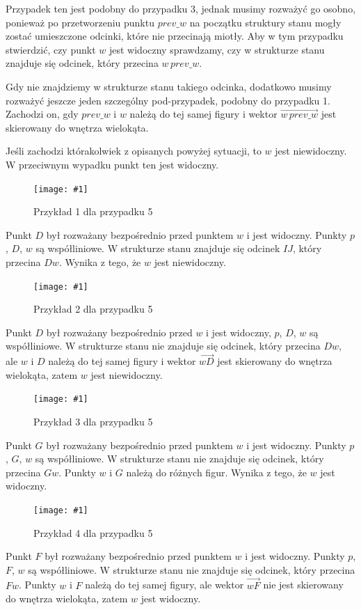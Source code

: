 \documentclass[12pt]{article}
\newcommand{\imgcustomsize}[3]{
	\begin{figure}[H]
		\centering
		\texttt{[image: \#1]}
		\caption{#2}
		\label{#1}
	\end{figure}
}
\newcommand{\img}[2]{\imgcustomsize{#1}{#2}{0.5}}
\begin{document}
			\vspace{\baselineskip} %
			Przypadek ten jest podobny do przypadku 3, jednak musimy rozważyć go osobno, ponieważ po przetworzeniu punktu $ prev\_w $ na początku struktury stanu mogły zostać umieszczone odcinki, które nie przecinają miotły. Aby w tym przypadku stwierdzić, czy punkt $ w $ jest widoczny sprawdzamy, czy w strukturze stanu znajduje się odcinek, który przecina $ w\,prev\_w $. 
			
			\vspace{\baselineskip} %
			Gdy nie znajdziemy w strukturze stanu takiego odcinka, dodatkowo musimy rozważyć jeszcze jeden szczególny pod-przypadek, podobny do przypadku 1. Zachodzi on, gdy $ prev\_w $ i $ w $ należą do tej samej figury i wektor $ \overrightarrow{w\,prev\_w} $ jest skierowany do wnętrza wielokąta.
			
			\vspace{\baselineskip} %
			Jeśli zachodzi którakolwiek z opisanych powyżej sytuacji, to $ w $ jest niewidoczny. W przeciwnym wypadku punkt ten jest widoczny.
			
			
			\img{przypadek5.1.jpg}{Przykład 1 dla przypadku 5}
			
			Punkt $ D $ był rozważany bezpośrednio przed punktem $ w $ i jest widoczny. Punkty $ p $, $ D $, $ w $ są współliniowe. W strukturze stanu znajduje się odcinek $IJ$, który przecina $Dw$. Wynika z tego, że $ w $ jest niewidoczny.
			
			\img{przypadek5.2.jpg}{Przykład 2 dla przypadku 5}
			
			Punkt $ D $ był rozważany bezpośrednio przed $ w $ i jest widoczny, $ p $, $ D $, $ w $ są współliniowe. W strukturze stanu nie znajduje się odcinek, który przecina $Dw$, ale $ w $ i $ D $ należą do tej samej figury i wektor $ \overrightarrow{wD} $ jest skierowany do wnętrza wielokąta, zatem $ w $ jest niewidoczny.
			
			\img{przypadek5.3.jpg}{Przykład 3 dla przypadku 5}
			
			Punkt $ G $ był rozważany bezpośrednio przed punktem $ w $ i jest widoczny. Punkty $ p $, $ G $, $ w $ są współliniowe. W strukturze stanu nie znajduje się odcinek, który przecina $Gw$. Punkty $ w $ i $ G $ należą do różnych figur. Wynika z tego, że $ w $ jest widoczny.
			
			\img{przypadek5.4.jpg}{Przykład 4 dla przypadku 5}
			
			Punkt $ F $ był rozważany bezpośrednio przed punktem $ w $ i jest widoczny. Punkty $ p $, $ F $, $ w $ są współliniowe. W strukturze stanu nie znajduje się odcinek, który przecina $Fw$. Punkty $ w $ i $ F $ należą do tej samej figury, ale wektor $ \overrightarrow{wF} $ nie jest skierowany do wnętrza wielokąta, zatem $ w $ jest widoczny.
		
\end{document}
